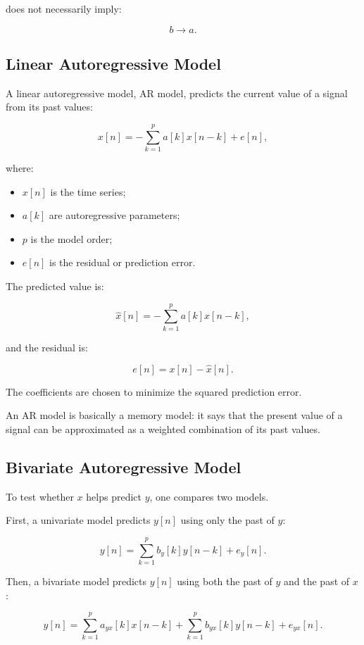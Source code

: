 does not necessarily imply:

\[
b \rightarrow a.
\]

\subsection{Linear Autoregressive Model}

A linear autoregressive model, AR model, predicts the current value of a signal from its past values:

\[
x[n]
=
-\sum_{k=1}^{p}
a[k]x[n-k]
+
e[n],
\]

where:

\begin{itemize}[noitemsep]
    \item $x[n]$ is the time series;
    \item $a[k]$ are autoregressive parameters;
    \item $p$ is the model order;
    \item $e[n]$ is the residual or prediction error.
\end{itemize}

The predicted value is:

\[
\hat{x}[n]
=
-\sum_{k=1}^{p}
a[k]x[n-k],
\]

and the residual is:

\[
e[n]
=
x[n] - \hat{x}[n].
\]

The coefficients are chosen to minimize the squared prediction error.

\begin{authornote}
An AR model is basically a memory model: it says that the present value of a signal can be approximated as a weighted combination of its past values.
\end{authornote}

\subsection{Bivariate Autoregressive Model}

To test whether $x$ helps predict $y$, one compares two models.

First, a univariate model predicts $y[n]$ using only the past of $y$:

\[
y[n]
=
\sum_{k=1}^{p}
b_y[k]y[n-k]
+
e_y[n].
\]

Then, a bivariate model predicts $y[n]$ using both the past of $y$ and the past of $x$:

\[
y[n]
=
\sum_{k=1}^{p}
a_{yx}[k]x[n-k]
+
\sum_{k=1}^{p}
b_{yx}[k]y[n-k]
+
e_{yx}[n].
\]

